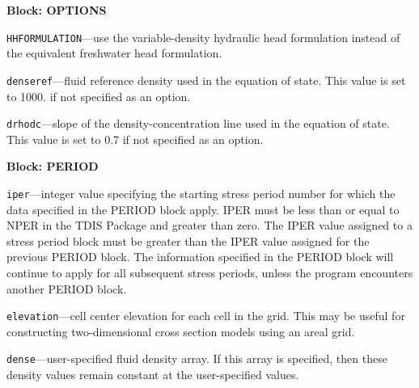 
\item \textbf{Block: OPTIONS}

\begin{description}
\item \texttt{HHFORMULATION}---use the variable-density hydraulic head formulation instead of the equivalent freshwater head formulation.

\item \texttt{denseref}---fluid reference density used in the equation of state.  This value is set to 1000. if not specified as an option.

\item \texttt{drhodc}---slope of the density-concentration line used in the equation of state.  This value is set to 0.7 if not specified as an option.

\end{description}
\item \textbf{Block: PERIOD}

\begin{description}
\item \texttt{iper}---integer value specifying the starting stress period number for which the data specified in the PERIOD block apply.  IPER must be less than or equal to NPER in the TDIS Package and greater than zero.  The IPER value assigned to a stress period block must be greater than the IPER value assigned for the previous PERIOD block.  The information specified in the PERIOD block will continue to apply for all subsequent stress periods, unless the program encounters another PERIOD block.

\item \texttt{elevation}---cell center elevation for each cell in the grid.  This may be useful for constructing two-dimensional cross section models using an areal grid.

\item \texttt{dense}---user-specified fluid density array.  If this array is specified, then these density values remain constant at the user-specified values.

\end{description}

